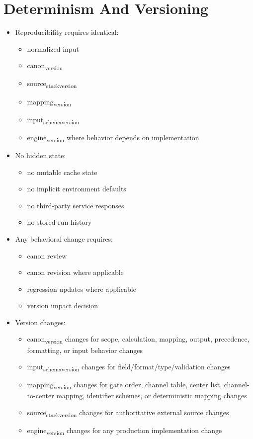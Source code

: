 \documentclass[11pt]{article}
\begin{document}
\section{Determinism And Versioning}
\label{sec:org0e2a13e}
\begin{itemize}
\item Reproducibility requires identical:
\begin{itemize}
\item normalized input
\item canon\textsubscript{version}
\item source\textsubscript{stack}\textsubscript{version}
\item mapping\textsubscript{version}
\item input\textsubscript{schema}\textsubscript{version}
\item engine\textsubscript{version} where behavior depends on implementation
\end{itemize}
\item No hidden state:
\begin{itemize}
\item no mutable cache state
\item no implicit environment defaults
\item no third-party service responses
\item no stored run history
\end{itemize}
\item Any behavioral change requires:
\begin{itemize}
\item canon review
\item canon revision where applicable
\item regression updates where applicable
\item version impact decision
\end{itemize}
\item Version changes:
\begin{itemize}
\item canon\textsubscript{version} changes for scope, calculation, mapping, output, precedence, formatting, or input behavior changes
\item input\textsubscript{schema}\textsubscript{version} changes for field/format/type/validation changes
\item mapping\textsubscript{version} changes for gate order, channel table, center list, channel-to-center mapping, identifier schemes, or deterministic mapping changes
\item source\textsubscript{stack}\textsubscript{version} changes for authoritative external source changes
\item engine\textsubscript{version} changes for any production implementation change
\end{itemize}
\end{itemize}
\end{document}
